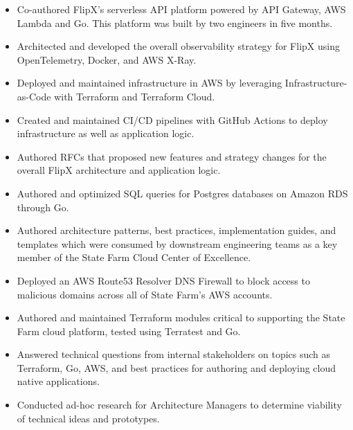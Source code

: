 \documentclass[10pt,a4paper,ragged2e,withhyper]{altacv}
\begin{document}

\makecvheader

\medskip


\begin{paracol}{2}



\begin{itemize}
\item Co-authored FlipX's serverless API platform powered by API Gateway, AWS Lambda and Go. This platform was built by two engineers in five months.
\item Architected and developed the overall observability strategy for FlipX using OpenTelemetry, Docker, and AWS X-Ray.
\item Deployed and maintained infrastructure in AWS by leveraging Infrastructure-as-Code with Terraform and Terraform Cloud.
\item Created and maintained CI/CD pipelines with GitHub Actions to deploy infrastructure as well as application logic.
\item Authored RFCs that proposed new features and strategy changes for the overall FlipX architecture and application logic.
\item Authored and optimized SQL queries for Postgres databases on Amazon RDS through Go.
\end{itemize}

\divider


\begin{itemize}
\item Authored architecture patterns, best practices, implementation guides, and templates which were consumed by downstream engineering teams as a key member of the State Farm Cloud Center of Excellence.
\item Deployed an AWS Route53 Resolver DNS Firewall to block access to malicious domains across all of State Farm's AWS accounts.
\item Authored and maintained Terraform modules critical to supporting the State Farm cloud platform, tested using Terratest and Go.
\item Answered technical questions from internal stakeholders on topics such as Terraform, Go, AWS, and best practices for authoring and deploying cloud native applications.
\item Conducted ad-hoc research for Architecture Managers to determine viability of technical ideas and prototypes.
\end{itemize}


\end{paracol}
\end{document}
